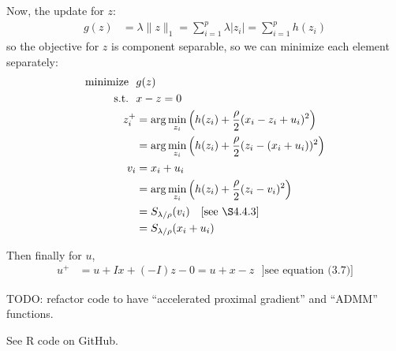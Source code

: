 \documentclass{article}
\begin{document}
Now, the update for $z$:
\begin{align*}
g(z)&=\lambda \lVert z\rVert_1=\sum_{i=1}^p \lambda |z_i|=\sum_{i=1}^p h(z_i)
\end{align*}
so the objective for $z$ is component separable, so we can minimize each element separately:
\begin{align*}
\textrm{minimize}~~ &g(z)\\
\textrm{s.t.}~~ & x-z=0\\
z_i^+&=\arg\min_{z_i} \left(h(z_i) + \frac{\rho}{2} (x_i-z_i+u_i)^2 \right)\\
&=\arg\min_{z_i} \left(h(z_i) + \frac{\rho}{2} (z_i-(x_i+u_i))^2 \right)\\
v_i&=x_i+u_i  \\
&=\arg\min_{z_i} \left(h(z_i) + \frac{\rho}{2} (z_i - v_i)^2 \right)\\
&=S_{\lambda/\rho}(v_i)~~~\textrm{[see \S4.4.3]}\\
&=S_{\lambda/\rho}(x_i+u_i)
\end{align*}

Then finally for $u$,
\begin{align*}
u^+&=u+I x + (-I)z-0=u+x-z~~~\textrm{]see equation (3.7)]}
\end{align*}



TODO: refactor code to have ``accelerated proximal gradient'' and ``ADMM'' functions.

See R code on GitHub.



\end{document}
